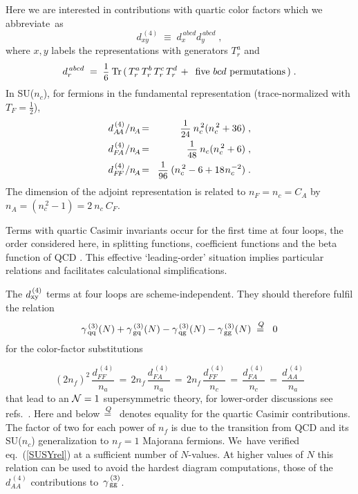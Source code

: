 \documentclass[12pt]{article}
\newcommand{\Qeq}{\raisebox{-0.1mm}{$\:\!\stackrel{Q_{\phantom{i\!\!\!\!}}}{=}\:\:$}}
\newcommand{\beq}{\begin{equation}}
\newcommand{\eeq}{\end{equation}}
\newcommand{\bea}{\begin{eqnarray}}
\newcommand{\eea}{\end{eqnarray}}
\def\frct#1#2{\mbox{\small{$\displaystyle\frac{#1}{#2}$}}}
\def\ncs{{n_{c}^{\,2}}}
\def\nf{{n^{}_{\! f}}}
\begin{document}
Here we are interested in contributions with quartic color factors which 
we abbreviate~as
%
\beq
\label{d4abbr}
  d^{\,(4)}_{xy} \;\equiv\; d_x^{\,abcd} d_y^{\,abcd}
\; ,
\eeq
where $x,y$ labels the representations with generators $T_r^a$ and
\beq
\label{d4def}
  d_{r}^{\,abcd} \; =\; \frct{1}{6}\: {\rm Tr} \, ( \, 
   T_{r}^{a\,} T_{r}^{b\,} T_{r}^{c\,} T_{r}^{d\,}
   + \,\mbox{ five $bcd$ permutations}\, ) \; .
\eeq
%
In SU($n_c$), for fermions in the fundamental representation
(trace-normalized with $T_F = \frac{1}{2}$),
%
\bea
\label{d4AASUn}
  d^{\,(4)}_{A\!A}/n^{}_{\!A} &\!=\!& 
  \frct{1}{24}\: \ncs ( \ncs + 36 ) 
\; , \\
\label{d4FASUn}
  d^{\,(4)}_{F\!A}/n^{}_{\!A} &\!=\!& 
  \frct{1}{48}\: n_c ( \ncs + 6 ) 
\;, \\
\label{d4FFSUn}
  d^{\,(4)}_{F\!F}/n^{}_{\!A} &\!=\!&
  \frct{1}{96}\: ( \ncs - 6 + 18\:\! n_c^{\:\!-2} )
\; .
\eea
%
The dimension of the adjoint representation is related to 
$n^{}_{F} = n_c = C_A$ by $n^{}_{\!A} = (\ncs - 1) = 2\:\!n_c\:\! C_F $.
 
Terms with quartic Casimir invariants occur for the first time at four loops, 
the order considered here, in splitting functions, coefficient functions and
the beta function of QCD \cite{beta3}.
This effective `leading-order' situation implies particular relations and 
facilitates calculational simplifications.

The $d^{\,(4)}_{\rm xy}$ terms at four loops are scheme-independent. 
They should therefore fulfil the relation
%
\beq
\label{SUSYrel}
    \gamma_{\,\rm qq}^{\,(3)}(N) + \gamma_{\,\rm gq}^{\,(3)}(N)
  - \gamma_{\,\rm qg}^{\,(3)}(N) - \gamma_{\,\rm gg}^{\,(3)}(N)
  \;\:\Qeq\:\: 0
\eeq
for the color-factor substitutions \cite{avLL16}

\pagebreak
\vspace*{-9mm}

\beq
\label{SUSYcol}
      (2 \nf)^2 \, \frac{d^{\,(4)}_{F\!F}}{n_a}
 \,=\, 2 \nf \, \frac{d^{\,(4)}_{FA}}{n_a}
 \,=\, 2 \nf \, \frac{d^{\,(4)}_{F\!F}}{n_c}
 \,=\, \frac{d^{\,(4)}_{FA}}{n_c}
 \,=\, \frac{d^{\,(4)}_{AA}}{n_a}
\eeq
that lead to an ${\cal N}=1$ supersymmetric theory, for lower-order discussions
see refs.~\cite{SUSY23loop}. 
Here and below $\Qeq$ denotes equality for the quartic Casimir contributions.
The factor of two for each power of $\nf$ is due to the transition from QCD 
and its SU($n_c$) generalization to $\nf = 1$ Majorana fermions. 
%
We~have verified eq.~(\ref{SUSYrel}) at a sufficient number of $N$-values.
At higher values of $N$ this relation can be used to avoid the hardest 
diagram computations, those of the $d^{\,(4)}_{A\!A}$ contributions 
to~$\gamma_{\,\rm gg}^{\,(3)}$.
\end{document}
